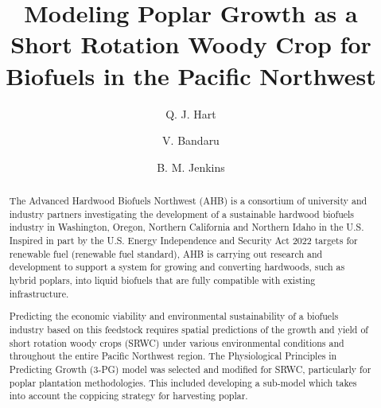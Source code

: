 \documentclass[preprint,12pt]{elsarticle}
\begin{document}
\begin{frontmatter}



\title{Modeling Poplar Growth as a Short Rotation Woody Crop for Biofuels in the Pacific Northwest}


\author[lawr]{Q. J. Hart}
\author[en]{V. Bandaru}
\author[bioag]{B. M. Jenkins}

\address{Department of Land, Air, and Water, University of California, Davis, USA}
\address{Energy Institute, University of California, Davis, USA}
\address{Department of Biological and Agricultural Engineering, University of California, Davis, USA}

\begin{abstract}
  The Advanced Hardwood Biofuels Northwest (AHB) is a consortium of
  university and industry partners investigating the development of a
  sustainable hardwood biofuels industry in Washington, Oregon,
  Northern California and Northern Idaho in the U.S.  Inspired in part
  by the U.S. Energy Independence and Security Act 2022 targets for
  renewable fuel (renewable fuel standard), AHB is carrying out
  research and development to support a system for growing and
  converting hardwoods, such as hybrid poplars, into liquid biofuels
  that are fully compatible with existing infrastructure.

  Predicting the economic viability and environmental sustainability
  of a biofuels industry based on this feedstock requires spatial
  predictions of the growth and yield of short rotation woody crops
  (SRWC) under various environmental conditions and throughout the
  entire Pacific Northwest region.  The Physiological Principles in
  Predicting Growth (3-PG) model was selected and modified for SRWC,
  particularly for poplar plantation methodologies.  This included
  developing a sub-model which takes into account the coppicing
  strategy for harvesting poplar.


\end{abstract}
\end{frontmatter}
\end{document}
